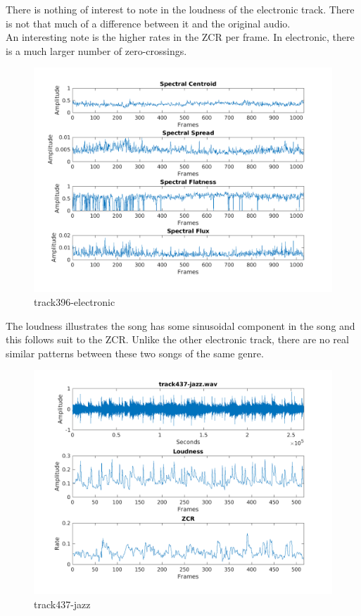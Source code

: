 \documentclass[11pt, a4paper]{article}
\begin{document}
There is nothing of interest to note in the loudness of the electronic track. There is not that much of a difference between it and the original audio.\\

An interesting note is the higher rates in the ZCR per frame. In electronic, there is a much larger number of zero-crossings. 

\begin{figure}[H]
    \centering
    \includegraphics[width=.8\textwidth]{track396-electronic-timedomain.png}
    \caption{track396-electronic}
\end{figure}

The loudness illustrates the song has some sinusoidal component in the song and this follows suit to the ZCR. Unlike the other electronic track, there are no real similar patterns between these two songs of the same genre.


\begin{figure}[H]
    \centering
    \includegraphics[width=.8\textwidth]{track437-jazz-timedomain.png}
    \caption{track437-jazz}
\end{figure}
\end{document}
